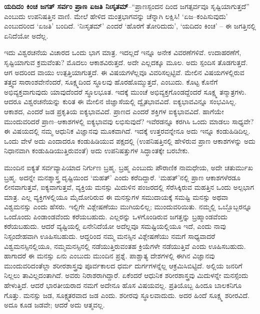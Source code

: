 \textbf{ಯದಿದಂ ಕಿಂಚ ಜಗತ್​ ಸರ್ವಂ ಪ್ರಾಣ ಏಜತಿ ನಿಃಸೃತಮ್​}–“ಪ್ರಾಣಸ್ಪಂದನ ದಿಂದ ಜಗತ್ಸರ್ವವೂ ಸೃಷ್ಟಿಯಾಗುತ್ತದೆ” ಎಂಬುದು ಉಪನಿಷತ್ತಿನ ವಾಣಿ. ಮೇಲೆ ಹೇಳಿದ ಮಂತ್ರಭಾಗವನ್ನು ಚೆನ್ನಾಗಿ ಲಕ್ಷಿಸಿ! ‘ಏಜ–ಕಂಪಿಸುವುದು’ ಎಂಬುದರಿಂದ ‘ಏಜತಿ’ ಬಂದಿದೆ. ‘ನಿಃಸೃತಮ್​’ ಎಂದರೆ ‘ಹೊರಗೆ ತೋರಿದುದು’, ‘ಯದಿದಂ ಕಿಂಚ’ – ಈ ಜಗತ್ತಿನಲ್ಲಿ ಏನಿದೆಯೋ ಅದೆಲ್ಲ. 

ಇದು ವಿಶ್ವರಚನೆಯ ವಿಚಾರದ ಒಂದು ಭಾಗ ಮಾತ್ರ. ಇದಲ್ಲದೆ ಇನ್ನೂ ಅನೇಕ ವಿವರಣೆಗಳಿವೆ. ಉದಾಹರಣೆಗೆ, ಸೃಷ್ಟಿಯಾಗುವ ಕ್ರಮವೆಂತು? ಮೊದಲು ಆಕಾಶವಿರುತ್ತದೆ. ಅದೇ ಎಲ್ಲದಕ್ಕೂ ಮೂಲ. ಅದು ಸ್ಪಂದಿಸ ತೊಡಗುತ್ತದೆ. ಆಗ ಅದರಿಂದ ವಾಯು ಉತ್ಪತ್ತಿಯಾಗುತ್ತದೆ. ಈ ವಿಷಯಗಳೆಲ್ಲವೂ ವಿವರಿಸಲ್ಪಟ್ಟಿವೆ. ಮೇಲಿನ ವಿಷಯಗಳಲ್ಲಿರುವ ತತ್ತ್ವದ ಸಾರಾಂಶವೇನೆಂದರೆ, ಸೂಕ್ಷ್ಮದಿಂದ ಸ್ಥೂಲವು ಹೊರಹೊಮ್ಮುತ್ತದೆ, ಎಂಬುದು. ಕೊಟ್ಟ ಕೊನೆಗೆ ಅಭಿವ್ಯಕ್ತವಾಗುವುದು ಯಾವುದೆಂದರೆ ಸ್ಥೂಲಭೂತ. ಇದಕ್ಕೆ ಮುಂಚೆ ಅಭಿವ್ಯಕ್ತಗೊಂಡದ್ದೆಂದರೆ ಸೂಕ್ಷ್ಮ ತನ್ಮಾತ್ರಗಳು. ಆದರೂ ವಿಶ್ವರಚನೆಯನ್ನು ಕುರಿತ ಈ ಮೇಲಿನ ಜಿಜ್ಞಾಸೆಯಲ್ಲಿ ದ್ವೈತಭಾವವಿದೆ. ಐಕ್ಯಭಾವವಿನ್ನೂ ಸಂಭವಿಸಿಲ್ಲ. ಆಕಾಶದ, ಎಂದರೆ ಜಡ ಪ್ರಕೃತಿಯ ಐಕ್ಯಭಾವವಿದೆ. ಪ್ರಾಣದ ಎಂದರೆ ಶಕ್ತಿಗಳ ಐಕ್ಯಭಾವವಿದೆ. ಹಾಗೆಯೇ ಮುಂದುವರಿದರೆ ಪ್ರಾಣ–ಆಕಾಶಗಳಲ್ಲಿ ಐಕ್ಯಭಾವವು ಲಭಿಸುವುದೆ? ಇವೆರಡನ್ನೂ ಕರಗಿಸಿ ಒಂದು ಮಾಡಲು ಸಾಧ್ಯವೇ? ಈ ವಿಷಯದಲ್ಲಿ ನಮ್ಮ ಆಧುನಿಕ ವಿಜ್ಞಾನವು ಮೂಕವಾಗಿದೆ. ಇದಕ್ಕೆ ಉತ್ತರವನ್ನೇನೂ ಅದು ಇನ್ನೂ ಕಂಡುಹಿಡಿದಿಲ್ಲ. ಒಂದು ವೇಳೆ ಅದು ಎಂದಾದರೂ ಕಂಡುಹಿಡಿಯುವ ಪಕ್ಷದಲ್ಲಿ (ಉಪನಿಷತ್ತಿನಲ್ಲಿ ಹೇಳಿರುವ ಪ್ರಾಣ ಆಕಾಶಗಳನ್ನು ಅದು ನಿಧಾನವಾಗಿ ಕಂಡುಹಿಡಿಯುತ್ತಿರುವಂತೆ) ಅದು ಉಪನಿಷತ್ತುಗಳ ಸಿದ್ಧಾಂತಕ್ಕೇ ಬರಬೇಕು. 

ಮುಂದಿನ ಐಕ್ಯತೆ ಸರ್ವವ್ಯಾಪಿಯಾದ ನಿರ್ಗುಣ ಬ್ರಹ್ಮ. ಬ್ರಹ್ಮ ಎಂಬುದು ಪೌರಾಣಿಕ ನಾಮಧೇಯ, ಅದೇ ಚತುರ್ಮುಖ ಬ್ರಹ್ಮ. ಅದನ್ನೇ ಮನಶ್ಶಾಸ್ತ್ರ ದೃಷ್ಟಿಯಿಂದ ‘ಮಹತ್​’ ಎಂದು ಕರೆದಿದ್ದಾರೆ. ‘ಮಹತ್​’ನಲ್ಲಿ ಪ್ರಾಣ ಆಕಾಶಗಳೆರಡೂ ಲೀನವಾಗುತ್ತವೆ, ಐಕ್ಯವಾಗುತ್ತವೆ, ವ್ಯಕ್ತಿಯ ಮನಸ್ಸು ಮಿದುಳಿನ ಪಂಜರದಲ್ಲಿ ಸೆರೆಸಿಕ್ಕಿರುವ ಮಹತ್ತಿನ ಒಂದು ಅಲ್ಪಭಾಗ ಮಾತ್ರ. ಎಲ್ಲ ವ್ಯಕ್ತಿಗಳಲ್ಲಿಯೂ ಮೈದೋರಿರುವ ಈ ಮನಸ್ಸುಗಳ ಸಮುದಾಯಕ್ಕೆ ಸಮಷ್ಟಿ ಮನಸ್ಸು ಅಥವಾ ವಿಶ್ವಮನಸ್ಸು ಎಂದು ಹೆಸರು. ಇಲ್ಲಿಗೇ ವಿಶ್ಲೇಷಣೆಯು ಮುಗಿಯಲಿಲ್ಲ; ಮುಂದುವರಿಯಿತು. ನಮ್ಮಲ್ಲಿ ಒಬ್ಬೊಬ್ಬರನ್ನೂ ಒಂದೊಂದು ಪಿಂಡಾಂಡವೆಂದು ಕರೆಯಬಹುದು. ಎಲ್ಲರನ್ನು ಒಳಗೊಂಡಿರುವ ಜಗತ್ತನ್ನು ಬ್ರಹ್ಮಾಂಡವೆಂದು ಕರೆಯಬಹುದು. ಆದರೆ ವ್ಯಷ್ಟಿಯಲ್ಲಿ ಏನೇನಿದೆಯೋ ಅದೆಲ್ಲವೂ ಸಮಷ್ಟಿಯಲ್ಲಿಯೂ ಇದೆ, ಎಂದು ನಾವು ನಿಸ್ಸಂದೇಹವಾಗಿ ಊಹಿಸಬಹುದು. ಆದ್ದರಿಂದ ನಮ್ಮ ಮನಸ್ಸಿನ ವಿಶ್ಲೇಷಣೆಯು ನಮಗೆ ಸಾಧ್ಯವಾದರೆ ವಿಶ್ವಮನಸ್ಸಿನಲ್ಲಿಯೂ, ನಮ್ಮ\break ಮನಸ್ಸಿನಲ್ಲಿ ನಡೆಯುತ್ತಿರುವಂತಹ ಕ್ರಿಯೆಗಳೇ ನಡೆಯುತ್ತಿವೆ ಎಂದು ಊಹಿಸಬಹುದು. ಹಾಗಾದರೆ ಈ ಮನಸ್ಸು ಏನು ಎಂಬುದು ಮುಂದಿನ ಪ್ರಶ್ನೆ. ಪಾಶ್ಚಾತ್ಯ ದೇಶಗಳಲ್ಲಿ ಈಗಿನ ವಿಜ್ಞಾನವು ಮುಂದುವರಿದಂತೆಲ್ಲಾ ಶರೀರಶಾಸ್ತ್ರವು ಪೂರ್ವಕಾಲದ ಧರ್ಮ ದುರ್ಗಗಳನ್ನೆಲ್ಲ ಆಕ್ರಮಿಸಿಬಿಟ್ಟಿದೆ. ಅಲ್ಲಿಯ ಜನರಿಗೆ ನಿಲ್ಲಲು ತಾವಿಲ್ಲದಂತಾಗಿದೆ. ಅವರು ನಿರಾಶರಾಗಿದ್ದಾರೆ. ಏಕೆಂದರೆ ಆಧುನಿಕ ಶರೀರಶಾಸ್ತ್ರವು ಮಿದುಳನ್ನೇ ಮನಸ್ಸೆಂದು ಹೇಳುತ್ತಿದೆ. ಆದರೆ ಭಾರತೀಯರಾದ ನಮಗೆ ಅದೇನೂ ಹೊಸ ವಿಷಯವಲ್ಲ. ಪ್ರತಿಯೊಬ್ಬ ಹಿಂದೂ ಬಾಲಕನಿಗೂ ಗೊತ್ತು. ಮನಸ್ಸು ಜಡ, ಸೂಕ್ಷ್ಮತರವಾದ ಜಡ ಎಂದು. ಶರೀರವು ಸ್ಥೂಲವಾದುದು. ಅದರ ಹಿಂದೆ ಸೂಕ್ಷ್ಮ ಶರೀರವಿದೆ. ಅದೂ ಕೂಡ ಜಡವೇ; ಆದರೆ ಅದು ಆತ್ಮವಲ್ಲ. 

